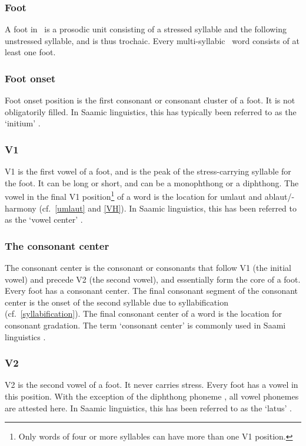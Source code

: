 \subsubsection{Foot}\label{foot}
A {foot} in \PS\ is a prosodic unit consisting of a stressed syllable and the following unstressed syllable, and is thus trochaic. Every multi-syllabic \PS\ word consists of at least one foot. 

\subsubsection{Foot onset}\label{footOnset}
{Foot onset} position is the first consonant or consonant cluster of a foot. It is not obligatorily filled. 
In Saamic linguistics, this has typically been referred to as the ‘initium’ \citep[cf.][39]{Sammallahti1998}.

\subsubsection{V1}\label{v1}
{V1} is the first vowel of a foot, and is the peak of the stress-carrying syllable for the foot. It can be long or short, and can be a monophthong or a diphthong. The vowel in the final V1 position\footnote{Only words of four or more syllables can have more than one V1 position.}
 of a word is the location for umlaut and ablaut/-harmony (cf.~\SEC\ref{umlaut} and \SEC\ref{VH}). 
In Saamic linguistics, this has been referred to as the ‘vowel center’ \citep[cf.][39]{Sammallahti1998}.

\subsubsection{The consonant center}\label{CCent}
The {consonant center} is the consonant or consonants that follow V1 (the initial vowel) and precede V2 (the second vowel), and essentially form the core 
of a foot. Every foot has a consonant center. The final consonant segment of the consonant center is the onset of the second syllable due to syllabification (cf.~\SEC\ref{syllabification}). The final consonant center of a word is the location for consonant gradation. The term ‘consonant center’ is commonly used in Saami linguistics \citep[cf.][39]{Sammallahti1998}. 

\subsubsection{V2}\label{v2}
{V2} is the second vowel of a foot. It never carries stress. Every foot has a vowel in this position. With the exception of the diphthong phoneme , all vowel phonemes are attested here. 
In Saamic linguistics, this has been referred to as the ‘latus’ \citep[cf.][39]{Sammallahti1998}.

